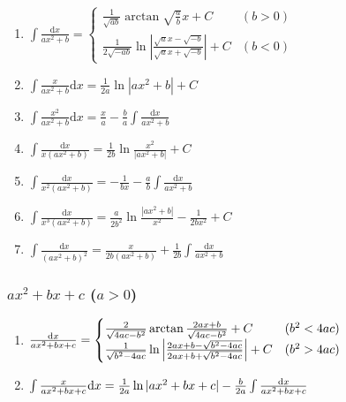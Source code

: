 \begin{tiny}
\begin{enumerate}[noitemsep]

\item $ \int \frac{\mathrm{d}x}{ax^2+b} = \begin{cases}
\frac{1}{\sqrt{ab}} \arctan \sqrt{\frac{a}{b}} x + C & (b > 0) \\
\frac{1}{2\sqrt{-ab}} \ln\left| \frac{\sqrt{a}x-\sqrt{-b}}{\sqrt{a}x+\sqrt{-b}} \right| + C & (b < 0)
\end{cases} $

\item $ \int \frac{x}{ax^2+b} \mathrm{d}x = \frac{1}{2a} \ln \left| ax^2 + b \right| + C $

\item $ \int \frac{x^2}{ax^2+b} \mathrm{d}x = \frac{x}{a} - \frac{b}{a}\int \frac{\mathrm{d}x}{ax^2+b} $

\item $ \int \frac{\mathrm{d}x}{x(ax^2+b)} = \frac{1}{2b} \ln \frac{x^2}{|ax^2+b|} + C $

\item $ \int \frac{\mathrm{d}x}{x^2(ax^2+b)} = -\frac{1}{bx} - \frac{a}{b} \int \frac{\mathrm{d}x}{ax^2+b} $

\item $ \int \frac{\mathrm{d}x}{x^3(ax^2+b)} = \frac{a}{2b^2} \ln \frac{|ax^2+b|}{x^2} - \frac{1}{2bx^2} + C $

\item $ \int \frac{\mathrm{d}x}{(ax^2+b)^2} = \frac{x}{2b(ax^2+b)} + \frac{1}{2b} \int \frac{\mathrm{d}x}{ax^2+b} $

\end{enumerate}

\subsubsection{$ax^2+bx+c$ ($a>0$)}

\begin{enumerate}[noitemsep]

\item $ \frac{\mathrm{d} x}{ax^2+bx+c} = \begin{cases}
\frac{2}{\sqrt{4ac-b^2}}\arctan\frac{2ax+b}{\sqrt{4ac-b^2}} + C & (b^2 < 4ac) \\
\frac{1}{\sqrt{b^2-4ac}}\ln\left| \frac{2ax+b-\sqrt{b^2-4ac}}{2ax+b+\sqrt{b^2-4ac}} \right| + C & (b^2 > 4ac)
\end{cases} $

\item $ \int \frac{x}{ax^2+bx+c} \mathrm{d} x = \frac{1}{2a} \ln |ax^2+bx+c| - \frac{b}{2a} \int \frac{\mathrm{d} x}{ax^2+bx+c} $


\end{enumerate}
\end{tiny}
